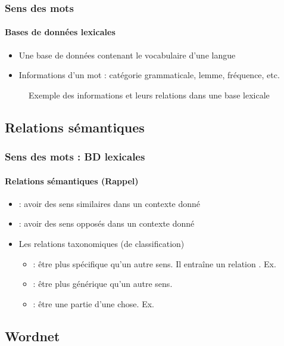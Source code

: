 \documentclass[xcolor=table]{beamer}
\begin{document}
\begin{frame}
	\frametitle{Sens des mots}
	\framesubtitle{Bases de données lexicales}
	
	\begin{itemize}
		\item Une base de données contenant le vocabulaire d'une langue
		\item Informations d'un mot : catégorie grammaticale, lemme, fréquence, etc.
	\end{itemize}

	\begin{figure}
		\centering 
		\caption{Exemple des informations et leurs relations dans une base lexicale \cite{2019-white-al}}
	\end{figure}
	
\end{frame}

\subsection{Relations sémantiques}

\begin{frame}
	\frametitle{Sens des mots : BD lexicales}
	\framesubtitle{Relations sémantiques (Rappel)}
	
	\begin{itemize}
		\item {} : avoir des sens similaires dans un contexte donné
		\item {} : avoir des sens opposés dans un contexte donné
		\item Les relations taxonomiques (de classification)
		\begin{itemize}
			\item {} : être plus spécifique qu'un autre sens. Il entraîne un relation . Ex.  
			\item {} : être plus générique qu'un autre sens. 
			\item {} : être une partie d'une chose. Ex. 
		\end{itemize}
	\end{itemize}
	
\end{frame}

\subsection{Wordnet}
\end{document}
